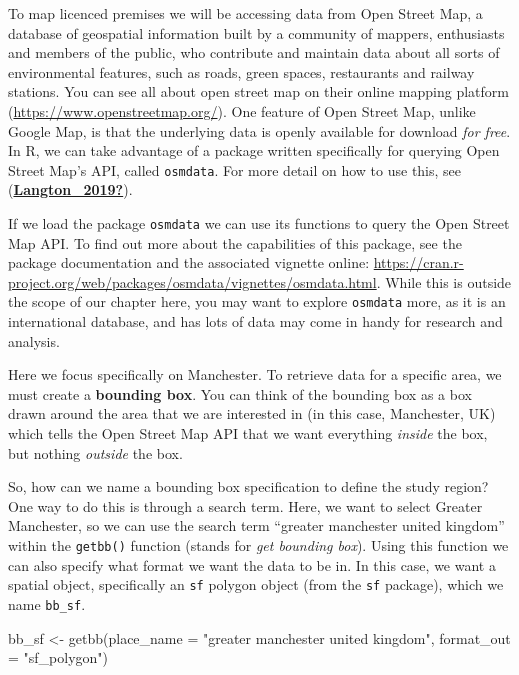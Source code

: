 \documentclass[
  krantz2]{krantz}
\makeatletter
\newenvironment{Shaded}{\begin{snugshade}}{\end{snugshade}}
\newcommand{\AttributeTok}[1]{\textcolor[rgb]{0.61,0.61,0.61}{#1}}
\newcommand{\FunctionTok}[1]{\textcolor[rgb]{0,0,0}{#1}}
\newcommand{\NormalTok}[1]{#1}
\newcommand{\OtherTok}[1]{\textcolor[rgb]{0.37,0.37,0.37}{#1}}
\newcommand{\StringTok}[1]{\textcolor[rgb]{0.5,0.5,0.5}{#1}}
\newenvironment{kframe}{%
\medskip{}
\setlength{\fboxsep}{.8em}
 \def\at@end@of@kframe{}%
 \ifinner\ifhmode%
  \def\at@end@of@kframe{\end{minipage}}%
  \begin{minipage}{\columnwidth}%
 \fi\fi%
 \def\FrameCommand##1{\hskip\@totalleftmargin \hskip-\fboxsep
 \colorbox{shadecolor}{##1}\hskip-\fboxsep
     \hskip-\linewidth \hskip-\@totalleftmargin \hskip\columnwidth}%
 \MakeFramed {\advance\hsize-\width
   \@totalleftmargin\z@ \linewidth\hsize
   \@setminipage}}%
 {\par\unskip\endMakeFramed%
 \at@end@of@kframe}
\renewenvironment{Shaded}{\begin{kframe}}{\end{kframe}}
\makeatother
\begin{document}
To map licenced premises we will be accessing data from Open Street Map, a database of geospatial information built by a community of mappers, enthusiasts and members of the public, who contribute and maintain data about all sorts of environmental features, such as roads, green spaces, restaurants and railway stations. You can see all about open street map on their online mapping platform (\url{https://www.openstreetmap.org/}). One feature of Open Street Map, unlike Google Map, is that the underlying data is openly available for download \emph{for free}. In R, we can take advantage of a package written specifically for querying Open Street Map's API, called \texttt{osmdata}. For more detail on how to use this, see (\protect\hyperlink{ref-Langton_2019}{\textbf{Langton\_2019?}}).

If we load the package \texttt{osmdata} we can use its functions to query the Open Street Map API. To find out more about the capabilities of this package, see the package documentation and the associated vignette online: \url{https://cran.r-project.org/web/packages/osmdata/vignettes/osmdata.html}. While this is outside the scope of our chapter here, you may want to explore \texttt{osmdata} more, as it is an international database, and has lots of data may come in handy for research and analysis.

Here we focus specifically on Manchester. To retrieve data for a specific area, we must create a \textbf{bounding box}. You can think of the bounding box as a box drawn around the area that we are interested in (in this case, Manchester, UK) which tells the Open Street Map API that we want everything \emph{inside} the box, but nothing \emph{outside} the box.

So, how can we name a bounding box specification to define the study region? One way to do this is through a search term. Here, we want to select Greater Manchester, so we can use the search term ``greater manchester united kingdom'' within the \texttt{getbb()} function (stands for \emph{get bounding box}). Using this function we can also specify what format we want the data to be in. In this case, we want a spatial object, specifically an \texttt{sf} polygon object (from the \texttt{sf} package), which we name \texttt{bb\_sf}.

\begin{Shaded}
\begin{Highlighting}[]
\NormalTok{bb\_sf }\OtherTok{\textless{}{-}} \FunctionTok{getbb}\NormalTok{(}\AttributeTok{place\_name =} \StringTok{"greater manchester united kingdom"}\NormalTok{, }
               \AttributeTok{format\_out =} \StringTok{"sf\_polygon"}\NormalTok{)}
\end{Highlighting}
\end{Shaded}
\end{document}
